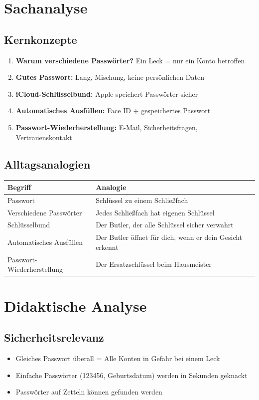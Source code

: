 \documentclass[11pt,a4paper]{article}
\begin{document}
\section{Sachanalyse}

\subsection{Kernkonzepte}
\begin{enumerate}
    \item \textbf{Warum verschiedene Passwörter?} Ein Leck = nur ein Konto betroffen
    \item \textbf{Gutes Passwort:} Lang, Mischung, keine persönlichen Daten
    \item \textbf{iCloud-Schlüsselbund:} Apple speichert Passwörter sicher
    \item \textbf{Automatisches Ausfüllen:} Face ID + gespeichertes Passwort
    \item \textbf{Passwort-Wiederherstellung:} E-Mail, Sicherheitsfragen, Vertrauenskontakt
\end{enumerate}

\subsection{Alltagsanalogien}
\begin{tabular}{|l|p{8cm}|}
\hline
\textbf{Begriff} & \textbf{Analogie} \\
\hline
Passwort & Schlüssel zu einem Schließfach \\
Verschiedene Passwörter & Jedes Schließfach hat eigenen Schlüssel \\
Schlüsselbund & Der Butler, der alle Schlüssel sicher verwahrt \\
Automatisches Ausfüllen & Der Butler öffnet für dich, wenn er dein Gesicht erkennt \\
Passwort-Wiederherstellung & Der Ersatzschlüssel beim Hausmeister \\
\hline
\end{tabular}

\section{Didaktische Analyse}

\subsection{Sicherheitsrelevanz}
\begin{warnbox}[Sicherheitskritisch]
\begin{itemize}
    \item Gleiches Passwort überall = Alle Konten in Gefahr bei einem Leck
    \item Einfache Passwörter (123456, Geburtsdatum) werden in Sekunden geknackt
    \item Passwörter auf Zetteln können gefunden werden
\end{itemize}
\end{warnbox}
\end{document}
